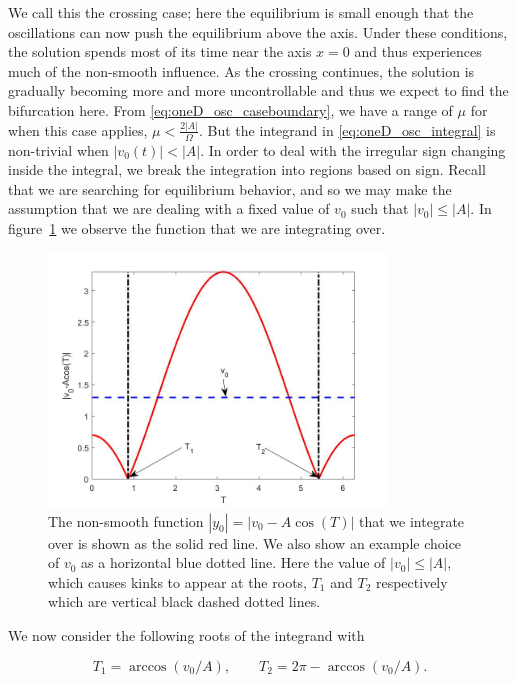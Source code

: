 We call this the crossing case; here the equilibrium is small enough that the oscillations can now push the equilibrium above the axis. Under these conditions, the solution spends most of its time near the axis $x=0$ and thus experiences much of the non-smooth influence. As the crossing continues, the solution is gradually becoming more and more uncontrollable and thus we expect to find the bifurcation here. From \eqref{eq:oneD_osc_caseboundary}, we have a range of $\mu$ for when this case applies, $\mu<\frac{2|A|}{\Omega}$. But the integrand in \eqref{eq:oneD_osc_integral} is non-trivial when $|v_0(t)|<|A|$. In order to deal with the irregular sign changing inside the integral, we break the integration into regions based on sign. Recall that we are searching for equilibrium behavior, and so we may make the assumption that we are dealing with a fixed value of $v_0$ such that $|v_0|\le |A|$. In figure~\ref{fig:oneD_osc_t1t2_graphic} we observe the function that we are integrating over.

\begin{figure}[H]
\centering
\includegraphics[width=0.8\textwidth]{oneD/t1t2_graphic.jpg}
\caption{The non-smooth function $|y_0|=|v_0-A\cos(T)|$ that we integrate over is shown as the solid red line. We also show an example choice of $v_0$ as a horizontal blue dotted line. Here the value of $|v_0|\le|A|$, which causes kinks to appear at the roots, $T_1$ and $T_2$ respectively which are vertical black dashed dotted lines. }
\label{fig:oneD_osc_t1t2_graphic}
\end{figure}

We now consider the following roots of the integrand with 

\begin{equation*}
T_1=\arccos (v_0/A),\qquad T_2= 2\pi - \arccos (v_0/A).
\end{equation*}

